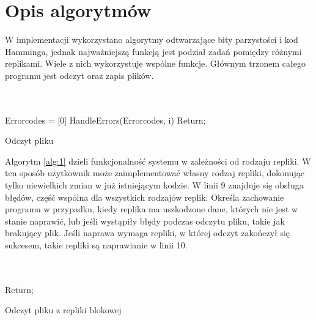 \newpage
\section{Opis algorytmów}
W implementacji wykorzystano algorytmy odtwarzające bity parzystości i kod Hamminga, jednak najważniejszą funkcją jest podział zadań pomiędzy różnymi replikami. Wiele z nich wykorzystuje wspólne funkcje. Głównym trzonem całego programu jest odczyt oraz zapis plików.
\\
\\
\\
{\small
\begin{pseudokod}[H]
    Errorcodes = [0]\;
    HandleErrors(Errorcodes, i)\;
Return;
\caption{Odczyt pliku}\label{alg:1}
\end{pseudokod}
}

Algorytm \ref{alg:1} dzieli funkcjonalność systemu w zależności od rodzaju repliki. W ten sposób użytkownik może zaimplementować własny rodzaj repliki, dokonując tylko niewielkich zmian w już istniejącym kodzie. W linii 9 znajduje się obsługa błędów, część wspólna dla wszystkich rodzajów replik. Określa zachowanie programu w przypadku, kiedy replika ma uszkodzone dane, których nie jest w stanie naprawić, lub jeśli wystąpiły błędy podczas odczytu pliku, takie jak brakujący plik. Jeśli naprawa wymaga repliki, w której odczyt zakończył się sukcesem, takie repliki są naprawianie w linii 10.
\\
\\
\\
{\small
\begin{pseudokod}[H]
    Return;
\caption{Odczyt pliku z repliki blokowej}\label{alg:2}
\end{pseudokod}
}


